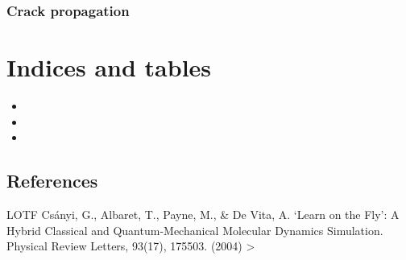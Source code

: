 \documentclass[letterpaper,10pt,english]{sphinxmanual}
\begin{document}
\subsection{Crack propagation}
\label{\detokenize{tutorials:crack-propagation}}

\chapter{Indices and tables}
\label{\detokenize{index:indices-and-tables}}\begin{itemize}
\item {} 

\item {} 

\item {} 

\end{itemize}


\section{References}
\label{\detokenize{index:references}}
\begin{sphinxthebibliography}{LOTF}
Csányi, G., Albaret, T., Payne, M., \& De Vita,
A. ‘Learn on the Fly’: A Hybrid Classical and Quantum-Mechanical
Molecular Dynamics Simulation. Physical Review Letters,
93(17), 175503. (2004) \textgreater{}
\end{sphinxthebibliography}


\renewcommand{\indexname}{Python Module Index}
\begin{sphinxtheindex}
\let\bigletter\sphinxstyleindexlettergroup
\bigletter{g}
\item\relax{}
\item\relax{}
\indexspace
\bigletter{q}
\item\relax{}
\end{sphinxtheindex}

\renewcommand{\indexname}{Index}
\printindex
\end{document}
